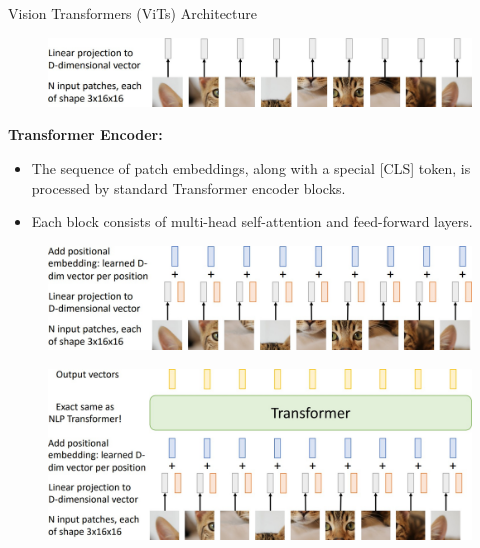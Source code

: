 \begin{frame}[allowframebreaks]{Vision Transformers (ViTs) Architecture}
    \framebreak

    \begin{figure}
        \flushleft
        \includegraphics[width=0.85\linewidth,height=\textheight,keepaspectratio]{images/vit/slide_60_1_img.jpg}
    \end{figure}

    \framebreak

    \textbf{Transformer Encoder:}
    \begin{itemize}
        \item The sequence of patch embeddings, along with a special [CLS] token, is processed by standard Transformer encoder blocks.
        \item Each block consists of multi-head self-attention and feed-forward layers.
    \end{itemize}

    \framebreak

    \begin{figure}
        \flushleft
        \includegraphics[width=0.85\linewidth,height=\textheight,keepaspectratio]{images/vit/slide_61_1_img.jpg}
    \end{figure}

    \framebreak

    \begin{figure}
        \flushleft
        \includegraphics[width=0.85\linewidth,height=\textheight,keepaspectratio]{images/vit/slide_62_1_img.jpg}
    \end{figure}


\end{frame}
